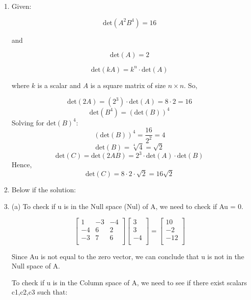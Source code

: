 \documentclass{article}
\begin{document}
\begin{enumerate}
Now, we see that matrix B is generated by swapping R2 and R3, scaling the second row by 9 and the third row by 2. Hencem the determinant of A is:

det(A) = -3*[(-1)*(2)*(9)*(6)] = 324


\item 

Given:

\[
\text{det}(A^2B^4) = 16
\]

and

\[
\text{det}(A) = 2
\]

\[
\text{det}(kA) = k^n \cdot \text{det}(A)
\]

where \(k\) is a scalar and \(A\) is a square matrix of size \(n \times n\). So,

\[
\text{det}(2A) = (2^3) \cdot \text{det}(A) = 8 \cdot 2 = 16
\]
\[
\text{det}(B^4) = (\text{det}(B))^4
\]
Solving for \(\text{det}(B)^4\):
\[
(\text{det}(B))^4 = \frac{16}{2^2} = 4
\]
\[
\text{det}(B) = \sqrt[4]{4} = \sqrt{2}
\]
\[
\text{det}(C) = \text{det}(2AB) = 2^3 \cdot \text{det}(A) \cdot \text{det}(B)
\]
Hence,\[
\text{det}(C) = 8 \cdot 2 \cdot \sqrt{2} = 16 \sqrt{2}
\]

\item Below if the solution:

\item 

(a) To check if u is in the Null space (Nul) of A, we need to check if Au = 0.

\[
\begin{bmatrix}
1 & -3 & -4 \\
-4 & 6 & 2 \\
-3 & 7 & 6 \\
\end{bmatrix}
\begin{bmatrix}
3\\
3 \\
-4 \\
\end{bmatrix}
=
\begin{bmatrix}
10 \\
-2 \\
-12 \\
\end{bmatrix}
\]

Since Au is not equal to the zero vector, we can conclude that u is not in the Null space of A.

To check if u is in the Column space of A, we need to see if there exist scalars c1,c2,c3 such that:


\end{enumerate}
\end{document}

